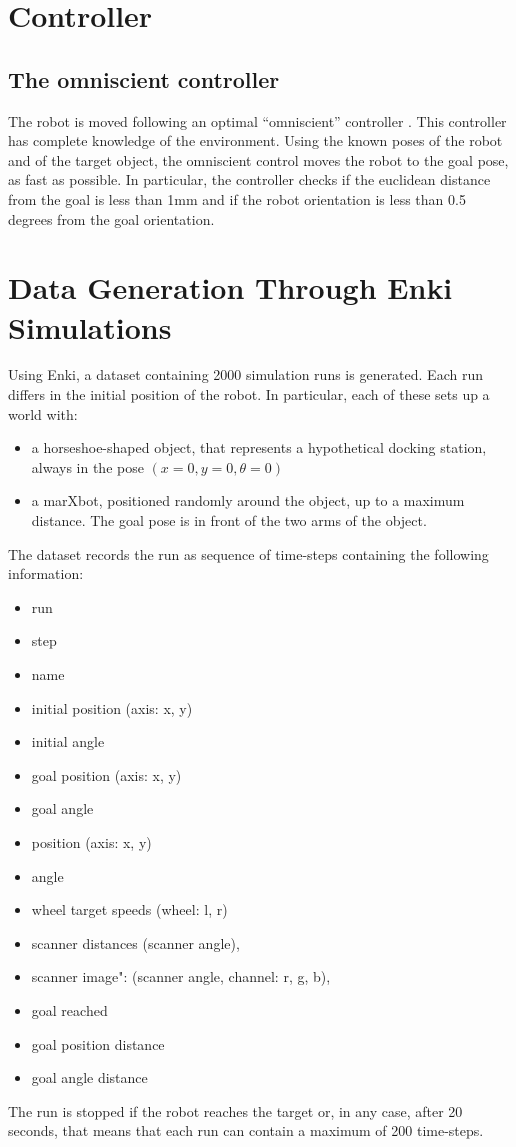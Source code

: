 \documentclass[conference]{IEEEtran}
\begin{document}
\section{Controller}

\subsection{The omniscient controller}

The robot is moved following an optimal “omniscient” controller \cite{park2011smooth}. This controller has complete 
knowledge of the environment. Using the known poses of the robot and of the target object, the omniscient control moves 
the robot to the goal pose, as fast as possible. In particular, the controller checks if the euclidean distance from 
the goal is less than 1mm and if the robot orientation is less than 0.5 degrees from the goal orientation.

\section{Data Generation Through Enki Simulations}
Using Enki, a dataset containing 2000 simulation runs is generated. Each run differs in the initial position of the 
robot. In particular, each of these sets up a world with:
\begin{itemize}
	\item a horseshoe-shaped object, that represents a hypothetical docking station, always in the pose $(x=0, y=0, 
	\theta=0)$
	\item a marXbot, positioned randomly around the object, up to a maximum distance. The goal pose is in front of the 
	two arms of the object.
\end{itemize}

The dataset records the run as sequence of time-steps containing the following information: 
\begin{itemize}
	\item run
	\item step
	\item name
	\item initial position (axis: x, y) 
	\item initial angle
	\item goal position (axis: x, y)
	\item goal angle
	\item position (axis: x, y) 
	\item angle
	\item wheel target speeds (wheel: l, r)
	\item scanner distances (scanner angle), 
	\item scanner image": (scanner angle, channel: r, g, b), 
	\item goal reached 
	\item goal position distance
	\item goal angle distance
\end{itemize}
The run is stopped if the robot reaches the target or, in any case, after 20 seconds, that means that each run can 
contain a maximum of 200 time-steps.
\end{document}
